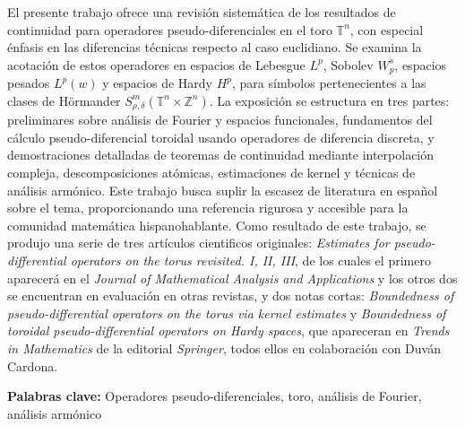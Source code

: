 
		El presente trabajo ofrece una revisión sistemática de los resultados de continuidad para operadores pseudo-diferenciales en el toro $\mathbb{T}^n$, con especial énfasis en las diferencias técnicas respecto al caso euclidiano. Se examina la acotación de estos operadores en espacios de Lebesgue $L^p$, Sobolev $W^s_p$, espacios pesados $L^p(w)$ y espacios de Hardy $H^p$, para símbolos pertenecientes a las clases de Hörmander $S^m_{\rho,\delta}(\mathbb{T}^n \times \mathbb{Z}^n)$. La exposición se estructura en tres partes: preliminares sobre análisis de Fourier y espacios funcionales, fundamentos del cálculo pseudo-diferencial toroidal usando operadores de diferencia discreta, y demostraciones detalladas de teoremas de continuidad mediante interpolación compleja, descomposiciones atómicas, estimaciones de kernel y técnicas de análisis armónico. Este trabajo busca suplir la escasez de literatura en español sobre el tema, proporcionando una referencia rigurosa y accesible para la comunidad matemática hispanohablante. Como resultado de este trabajo, se produjo una serie de tres artículos cientificos originales: \textit{Estimates for pseudo-differential operators on the torus revisited. I, II, III}, de los cuales el primero aparecerá en el \textit{Journal of Mathematical Analysis and Applications} y los otros dos se encuentran en evaluación en otras revistas, y dos notas cortas: \textit{Boundedness of pseudo-differential operators on the torus via kernel estimates} y \textit{Boundedness of toroidal pseudo-differential operators on Hardy spaces}, que apareceran en \textit{Trends in Mathematics} de la editorial \textit{Springer}, todos ellos en colaboración con Duván Cardona.
		
		\textbf{Palabras clave:} Operadores pseudo-diferenciales, toro, análisis de Fourier, análisis armónico


